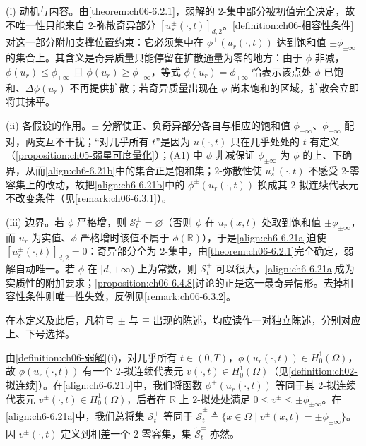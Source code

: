 \documentclass[../../main.tex]{subfiles}%
\begin{document}
\begin{remark}\label{remark:ch06-相容动机}
(i) 动机与内容。由\cref{theorem:ch06-6.2.1}，弱解的 $2$-集中部分被初值完全决定，故不唯一性只能来自 $2$-弥散奇异部分 $[u^\pm_s(\cdot,t)]_{d,2}$。\cref{definition:ch06-相容性条件}对这一部分附加支撑位置约束：它必须集中在 $\phi^\pm(u_r(\cdot,t))$ 达到饱和值 $\pm\phi_{\pm\infty}$ 的集合上。其含义是奇异质量只能停留在扩散通量为零的地方：由于 $\phi$ 非减，$\phi(u_r)\leqslant\phi_{+\infty}$ 且 $\phi(u_r)\geqslant\phi_{-\infty}$，等式 $\phi(u_r)=\phi_{+\infty}$ 恰表示该点处 $\phi$ 已饱和、$\Delta\phi(u_r)$ 不再提供扩散；若奇异质量出现在 $\phi$ 尚未饱和的区域，扩散会立即将其抹平。

(ii) 各假设的作用。$\pm$ 分解使正、负奇异部分各自与相应的饱和值 $\phi_{+\infty}$、$\phi_{-\infty}$ 配对，两支互不干扰；“对几乎所有 $t$”是因为 $u(\cdot,t)$ 只在几乎处处的 $t$ 有定义（\cref{proposition:ch05-弱星可度量化}）；(A1) 中 $\phi$ 非减保证 $\phi_{\pm\infty}$ 为 $\phi$ 的上、下确界，从而\eqref{align:ch6-6.21b}中的集合正是饱和集；$2$-弥散性使 $u^\pm_s(\cdot,t)$ 不感受 $2$-零容集上的改动，故把\eqref{align:ch6-6.21b}中的 $\phi^\pm(u_r(\cdot,t))$ 换成其 $2$-拟连续代表元不改变条件（见\cref{remark:ch06-6.3.1}）。

(iii) 边界。若 $\phi$ 严格增，则 $\mathscr{S}^\pm_t=\varnothing$（否则 $\phi$ 在 $u_r(x,t)$ 处取到饱和值 $\pm\phi_{\pm\infty}$，而 $u_r$ 为实值、$\phi$ 严格增时该值不属于 $\phi(\mathbb{R})$），于是\eqref{align:ch6-6.21a}迫使 $[u^\pm_s(\cdot,t)]_{d,2}=0$：奇异部分全为 $2$-集中，由\cref{theorem:ch06-6.2.1}完全确定，弱解自动唯一。若 $\phi$ 在 $[d,+\infty)$ 上为常数，则 $\mathscr{S}^+_t$ 可以很大，\eqref{align:ch6-6.21a}成为实质性的附加要求；\cref{proposition:ch06-6.4.8}讨论的正是这一最奇异情形。去掉相容性条件则唯一性失效，反例见\cref{remark:ch06-6.3.2}。
\end{remark}

在本定义及此后，凡符号 $\pm$ 与 $\mp$ 出现的陈述，均应读作一对独立陈述，分别对应上、下号选择。

\begin{remark}\label{remark:ch06-6.3.1}
由\cref{definition:ch06-弱解}(i)，对几乎所有 $t\in(0,T)$，$\phi(u_r(\cdot,t))\in H^1_0(\Omega)$，故 $\phi(u_r(\cdot,t))$ 有一个 $2$-拟连续代表元 $v(\cdot,t)\in H^1_0(\Omega)$（见\cref{definition:ch02-拟连续}）。在\eqref{align:ch6-6.21b}中，我们将函数 $\phi^\pm(u_r(\cdot,t))$ 等同于其 $2$-拟连续代表元 $v^\pm(\cdot,t)\in H^1_0(\Omega)$，后者在 $\mathbb{R}$ 上 $2$-拟处处满足 $0\leqslant v^\pm\leqslant\pm\phi_{\pm\infty}$。在\eqref{align:ch6-6.21a}中，我们总将集 $\mathscr{S}^\pm_t$ 等同于 $\widetilde{\mathscr{S}}^\pm_t\triangleq\{x\in\Omega\mid v^\pm(x,t)=\pm\phi_{\pm\infty}\}$。因 $v^\pm(\cdot,t)$ 定义到相差一个 $2$-零容集，集 $\widetilde{\mathscr{S}}^\pm_t$ 亦然。
\end{remark}
\end{document}

